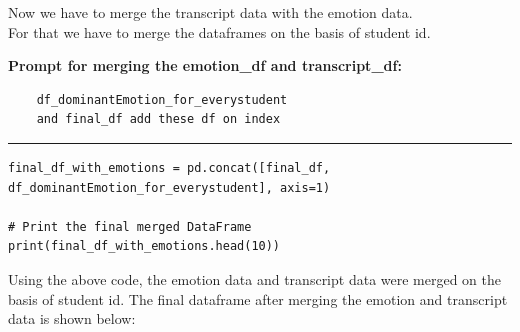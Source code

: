 \documentclass[11pt,a4paper]{article}
\begin{document}
\begin{tcolorbox}[colback=yellow!10!white, colframe=red!80!black, title=Note]
  Now we have to merge the transcript data with the emotion data. \\
  For that we have to merge the dataframes on the basis of student id.
\end{tcolorbox}

\textbf{Prompt for merging the emotion\_df and transcript\_df:}
\begin{verbatim}
    df_dominantEmotion_for_everystudent
    and final_df add these df on index
\end{verbatim}
\begin{center}
    \color{red}\rule{1\linewidth}{0.5mm}
\end{center}

\begin{tcolorbox}
\begin{lstlisting}
final_df_with_emotions = pd.concat([final_df, df_dominantEmotion_for_everystudent], axis=1)

# Print the final merged DataFrame
print(final_df_with_emotions.head(10))

\end{lstlisting}
\end{tcolorbox}

\large{Using the above code, the emotion data and transcript data were merged on the basis of student id.}
\large{The final dataframe after merging the emotion and transcript data is shown below:}
\end{document}
